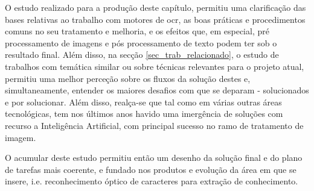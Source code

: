 O estudo realizado para a produção deste capítulo, permitiu uma clarificação das bases relativas ao trabalho com motores de \acrshort{ocr}, as boas práticas e procedimentos comuns no seu tratamento e melhoria, e os efeitos que, em especial, pré processamento de imagens e pós processamento de texto podem ter sob o resultado final. Além disso, na secção \ref{sec_trab_relacionado}, o estudo de trabalhos com temática similar ou sobre técnicas relevantes para o projeto atual, permitiu uma melhor perceção sobre os fluxos da solução destes e, simultaneamente, entender os maiores desafios com que se deparam - solucionados e por solucionar. Além disso, realça-se que tal como em várias outras áreas tecnológicas, tem nos últimos anos havido uma imergência de soluções com recurso a Inteligência Artificial, com principal sucesso no ramo de tratamento de imagem.

O acumular deste estudo permitiu então um desenho da solução final e do plano de tarefas mais coerente, e fundado nos produtos e evolução da área em que se insere, i.e. reconhecimento óptico de caracteres para extração de conhecimento.

